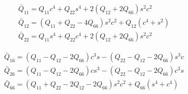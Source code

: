 \documentclass[smallextended]{svjour3}       %
\begin{document}
\begin{equation}
	\begin{array}{l}\bar{Q}_{11}=Q_{11} c^{4}+Q_{22} s^{4}+2\left(Q_{12}+2 Q_{66}\right) s^{2} c^{2}
		\\ \bar{Q}_{12}=\left(Q_{11}+Q_{22}-4 Q_{66}\right) s^{2}
		c^{2}+Q_{12}\left(c^{4}+s^{2}\right) \\ \bar{Q}_{22}=Q_{11} s^{4}+Q_{22}
	c^{4}+2\left(Q_{12}+2 Q_{66}\right) s^{2} c^{2}\end{array}
\end{equation}

\begin{equation}
	\begin{array}{l}\bar{Q}_{16}=\left(Q_{11}-Q_{12}-2 Q_{66}\right) c^{3} s-\left(Q_{22}-Q_{12}-2
			Q_{66}\right) s^{3} c \\ \bar{Q}_{26}=\left(Q_{11}-Q_{12}-2 Q_{66}\right) c
			s^{3}-\left(Q_{22}-Q_{12}-2 Q_{66}\right) c^{3} s \\ \bar{Q}_{66}=\left(Q_{11}+Q_{22}-2
		Q_{12}-2 Q_{66}\right) s^{2} c^{2}+Q_{66}\left(s^{4}+c^{4}\right)\end{array}
\end{equation}
\end{document}
